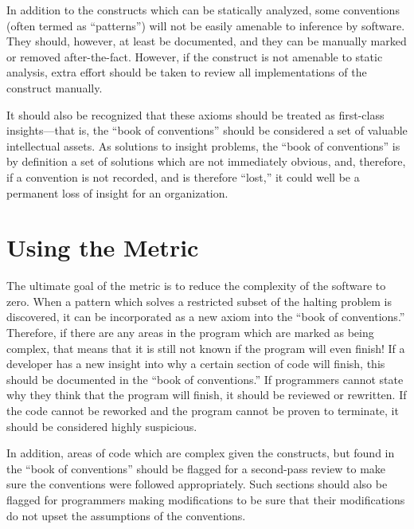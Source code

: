 In addition to the constructs which can be statically analyzed, some conventions (often termed as ``patterns'') will not be easily amenable to inference by software.  They should, however, at least be documented, and they can be manually marked or removed after-the-fact.  However, if the construct is not amenable to static analysis, extra effort should be taken to review all implementations of the construct manually.

It should also be recognized that these axioms should be treated as first-class insights---that is, the ``book of conventions'' should be considered a set of valuable intellectual assets.  As solutions to insight problems, the ``book of conventions'' is by definition a set of solutions which are not immediately obvious, and, therefore, if a convention is not recorded, and is therefore ``lost,'' it could well be a permanent loss of insight for an organization.


\section{Using the Metric}

The ultimate goal of the metric is to reduce the complexity of the software to zero. When a pattern which solves a restricted subset of the halting problem is discovered, it can be incorporated as a new axiom into the ``book of conventions.''  Therefore, if there are any areas in the program which are marked as being complex, that means that it is still not known if the program will even finish!  If a developer has a new insight into why a certain section of code will finish, this should be documented in the ``book of conventions.''  If programmers cannot state why they think that the program will finish, it should be reviewed or rewritten.  If the code cannot be reworked and the program cannot be proven to terminate, it should be considered highly suspicious.

In addition, areas of code which are complex given the constructs, but found in the ``book of conventions'' should be flagged for a second-pass review to make sure the conventions were followed appropriately.  Such sections should also be flagged for programmers making modifications to be sure that their modifications do not upset the assumptions of the conventions.

